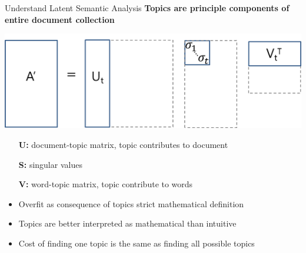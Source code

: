 \documentclass[10pt]{beamer}
\begin{document}
\begin{frame}{Understand Latent Semantic Analysis}
  {\bf Topics are principle components of entire document collection}

  \begin{multicols}{2}
    \includegraphics[width=\columnwidth]{svd.png}
    \columnbreak

    \begin{itemize}
      \item[{\bf U:}] document-topic matrix, topic contributes to document
      \item[{\bf S:}] singular values
      \item[{\bf V:}] word-topic matrix, topic contribute to words
    \end{itemize}
  \end{multicols}

  \begin{itemize}
  \item Overfit as consequence of topics strict mathematical definition
  \item Topics are better interpreted as mathematical than intuitive
  \item Cost of finding one topic is the same as finding all possible topics
  \end{itemize}


\end{frame}
\end{document}
